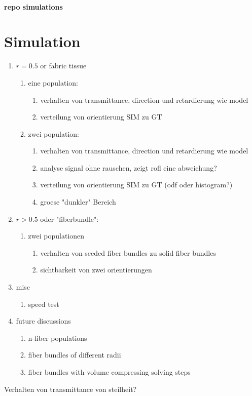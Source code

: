 \paragraph{repo simulations}
% 
% 
% 
\section{Simulation}
% 
\begin{enumerate}
\item $r=0.5$ or fabric tissue 
\begin{enumerate}
\item eine population:
\begin{enumerate}
    \item verhalten von transmittance, direction und retardierung wie model
    \item verteilung von orientierung SIM zu GT
\end{enumerate}
% 
\item zwei population:
\begin{enumerate}
    \item verhalten von transmittance, direction und retardierung wie model
    \item analyse signal ohne rauschen, zeigt rofl eine abweichung?
    \item verteilung von orientierung SIM zu GT (odf oder histogram?)
    \item groese "dunkler" Bereich
\end{enumerate}
\end{enumerate}
% 
\item $r > 0.5$ oder "fiberbundle":
\begin{enumerate}
\item zwei populationen
\begin{enumerate}
    \item verhalten von seeded fiber bundles zu solid fiber bundles
    \item sichtbarkeit von zwei orientierungen
\end{enumerate}
\end{enumerate}
% 
\item misc
\begin{enumerate}
    \item speed test
\end{enumerate}
% 
\item future discussions
\begin{enumerate}
    \item n-fiber populations
    \item fiber bundles of different radii
    \item fiber bundles with volume compressing solving steps
\end{enumerate}
\end{enumerate}
% 
Verhalten von transmittance von steilheit?
% 
% 
% 
